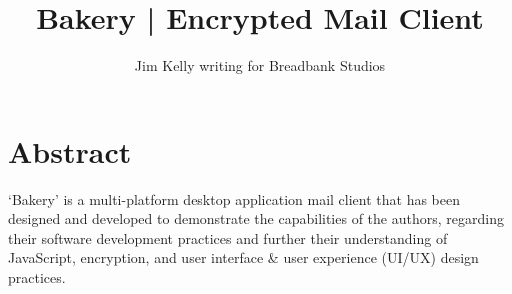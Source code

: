 \documentclass[12pt]{article}
\title{Bakery | Encrypted Mail Client}
\author{Jim Kelly writing for Breadbank Studios}
\begin{document}
\maketitle
\vspace{40pt}
\section{Abstract}
\noindent `Bakery' is a multi-platform desktop application mail client that has been designed and developed to demonstrate the capabilities of the authors, regarding their software development practices and further their understanding of JavaScript, encryption, and user interface \& user experience (UI/UX) design practices. 



\end{document}
